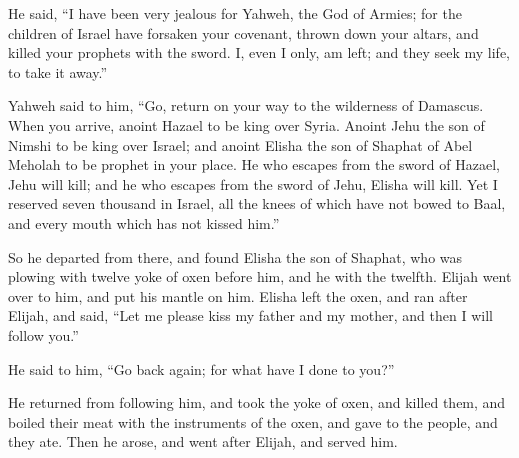 {\par }{\PP {}He said, “I have been very jealous for Yahweh, the God of Armies; for the children of Israel have forsaken your covenant, thrown down your altars, and killed your prophets with the sword. I, even I only, am left; and they seek my life, to take it away.”
\par }{\PP {}Yahweh said to him, “Go, return on your way to the wilderness of Damascus. When you arrive, anoint Hazael to be king over Syria.
Anoint Jehu the son of Nimshi to be king over Israel; and anoint Elisha the son of Shaphat of Abel Meholah to be prophet in your place.
He who escapes from the sword of Hazael, Jehu will kill; and he who escapes from the sword of Jehu, Elisha will kill.
Yet I reserved seven thousand in Israel, all the knees of which have not bowed to Baal, and every mouth which has not kissed him.”
\par }{\PP {}So he departed from there, and found Elisha the son of Shaphat, who was plowing with twelve yoke of oxen before him, and he with the twelfth. Elijah went over to him, and put his mantle on him.
Elisha left the oxen, and ran after Elijah, and said, “Let me please kiss my father and my mother, and then I will follow you.”
\par }{\PP He said to him, “Go back again; for what have I done to you?”
\par }{\PP {}He returned from following him, and took the yoke of oxen, and killed them, and boiled their meat with the instruments of the oxen, and gave to the people, and they ate. Then he arose, and went after Elijah, and served him.

}
